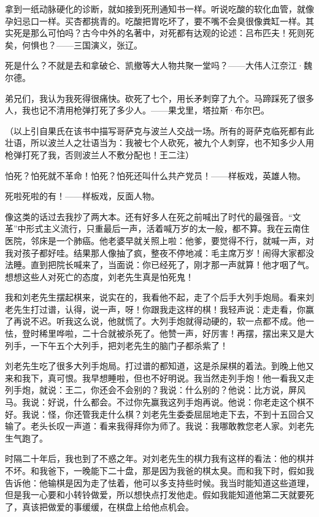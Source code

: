 拿到一纸动脉硬化的诊断，就如接到死刑通知书一样。听说吃酸的软化血管，就像孕妇忌口一样。买杏都挑青的。吃酸把胃吃坏了，要不嘴不会臭很像粪缸一样。其实死是那么可怕吗？古今中外的名著中，对死都有达观的论述：吕布匹夫！死则死矣，何惧也？——三国演义，张辽。 

死是什么？不就是去和拿破仑、凯撤等大人物共聚一堂吗？——大伟人江奈江·魏尔德。 

弟兄们，我认为我死得很痛快。砍死了七个，用长矛刺穿了九个。马蹄踩死了很多人，我也记不清用枪弹打死了多少人。——果戈里，塔拉斯·布尔巴。 

（以上引自果氏在该书中描写哥萨克与波兰人交战一场。所有的哥萨克临死都有此壮语，所以波兰人之壮语当为：我被七个人砍死，被九个人刺穿，也不知多少人用枪弹打死了我，否则波兰人不敷分配也！王二注） 

怕死？怕死就不革命！怕死？怕死还叫什么共产党员！——样板戏，英雄人物。 

死啦死啦的有！——样板戏，反面人物。 

像这类的话过去我抄了两大本。还有好多人在死之前喊出了时代的最强音。“文革”中形式主义流行，只重最后一声，活着喊万岁的太一般，都不算。我在云南住医院，邻床是一个肺癌。他老婆早就关照上啦：他爹，要觉得不行，就喊一声，对我对孩子都好哇。结果那人像抽了疯，整夜不停地减：毛主席万岁！闹得大家都没法睡。直到把院长喊来了，当面说：你已经死了，刚才那一声就算！他才咽了气。想想这些人对死亡的态度，刘老先生真是怕死鬼！ 

我和刘老先生摆起棋来，说实在的，我看他不起，走了个后手大列手炮局。看来刘老先生打过谱，认得，说一声，呀！你跟我走这样的棋！我轻声说：走走看，你赢了再说不迟。听我这么说，他就慌了。大列手炮就得动硬的，软一点都不成。他一怯，登时稀里哗啦，二十合就被杀死了。他赞一声，好厉害！再摆，摆出来又是大列手，一下午五个大列手，把刘老先生的脑门子都杀紫了！ 

刘老先生吃了很多大列手炮局。打过谱的都知道，这是杀屎棋的着法。到晚上他又来和我下，真可恨。我早想睡啦，但也不好明说。我当然走列手炮！他一看我又走列手炮，就说：王二，你还会不会别的？我说：什么别的？他说：比方说，屏风马。我说：好说，什么都会。不过你先赢我这列手炮再说。他说：你老走这个棋不好。我说：怪，你还管我走什么棋？刘老先生委委屈屈地走下去，不到十五回合又输了。老头长叹一声道：看来我得拜你为师了。我说：我哪敢教您老人家。刘老先生气跑了。 

时隔二十年后，我也到了不惑之年。对刘老先生的棋力我有这样的看法：他的棋并不坏。和我爸下，一晚能下二十盘，那是因为我爸的棋太臭。而和我下时，假如我告诉他：他输棋是因为走了怯着，他可以多支持些时候。我当时能知道这些道理，但是我一心要和小转铃做爱，所以想快点打发他走。假如我能知道他第二天就要死了，真该把做爱的事缓缓，在棋盘上给他点机会。 

